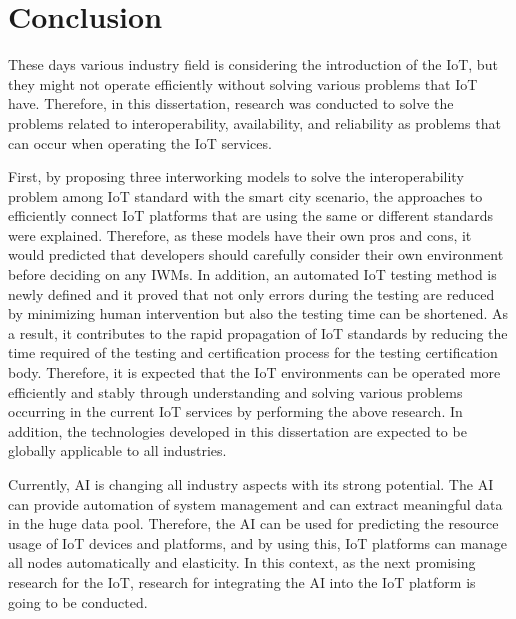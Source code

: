 \section{Conclusion}
These days various industry field is considering the introduction of the IoT, but they might not operate efficiently without solving various problems that IoT have. Therefore, in this dissertation, research was conducted to solve the problems related to interoperability, availability, and reliability as problems that can occur when operating the IoT services.

First, by proposing three interworking models to solve the interoperability problem among IoT standard with the smart city scenario, the approaches to efficiently connect IoT platforms that are using the same or different standards were explained. Therefore, as these models have their own pros and cons, it would predicted that developers should carefully consider their own environment before deciding on any IWMs. In addition, an automated IoT testing method is newly defined and it proved that not only errors during the testing are reduced by minimizing human intervention but also the testing time can be shortened. As a result, it contributes to the rapid propagation of IoT standards by reducing the time required of the testing and certification process for the testing certification body. Therefore, it is expected that the IoT environments can be operated more efficiently and stably through understanding and solving various problems occurring in the current IoT services by performing the above research. In addition, the technologies developed in this dissertation are expected to be globally applicable to all industries. 

Currently, AI is changing all industry aspects with its strong potential. The AI can provide automation of system management and can extract meaningful data in the huge data pool. Therefore, the AI can be used for predicting the resource usage of IoT devices and platforms, and by using this, IoT platforms can manage all nodes automatically and elasticity. In this context, as the next promising research for the IoT, research for integrating the AI into the IoT platform is going to be conducted.

\clearpage